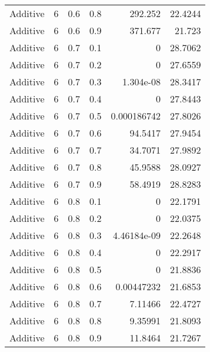 \documentclass{article}
\begin{document}
\begin{longtable}[H]{lrrrrr}
 Additive       &       6 &   0.6 &            0.8 &    292.252       &         22.4244 \\
 Additive       &       6 &   0.6 &            0.9 &    371.677       &         21.723  \\
 Additive       &       6 &   0.7 &            0.1 &      0           &         28.7062 \\
 Additive       &       6 &   0.7 &            0.2 &      0           &         27.6559 \\
 Additive       &       6 &   0.7 &            0.3 &      1.304e-08   &         28.3417 \\
 Additive       &       6 &   0.7 &            0.4 &      0           &         27.8443 \\
 Additive       &       6 &   0.7 &            0.5 &      0.000186742 &         27.8026 \\
 Additive       &       6 &   0.7 &            0.6 &     94.5417      &         27.9454 \\
 Additive       &       6 &   0.7 &            0.7 &     34.7071      &         27.9892 \\
 Additive       &       6 &   0.7 &            0.8 &     45.9588      &         28.0927 \\
 Additive       &       6 &   0.7 &            0.9 &     58.4919      &         28.8283 \\
 Additive       &       6 &   0.8 &            0.1 &      0           &         22.1791 \\
 Additive       &       6 &   0.8 &            0.2 &      0           &         22.0375 \\
 Additive       &       6 &   0.8 &            0.3 &      4.46184e-09 &         22.2648 \\
 Additive       &       6 &   0.8 &            0.4 &      0           &         22.2917 \\
 Additive       &       6 &   0.8 &            0.5 &      0           &         21.8836 \\
 Additive       &       6 &   0.8 &            0.6 &      0.00447232  &         21.6853 \\
 Additive       &       6 &   0.8 &            0.7 &      7.11466     &         22.4727 \\
 Additive       &       6 &   0.8 &            0.8 &      9.35991     &         21.8093 \\
 Additive       &       6 &   0.8 &            0.9 &     11.8464      &         21.7267 \\

\end{longtable}
\end{document}

